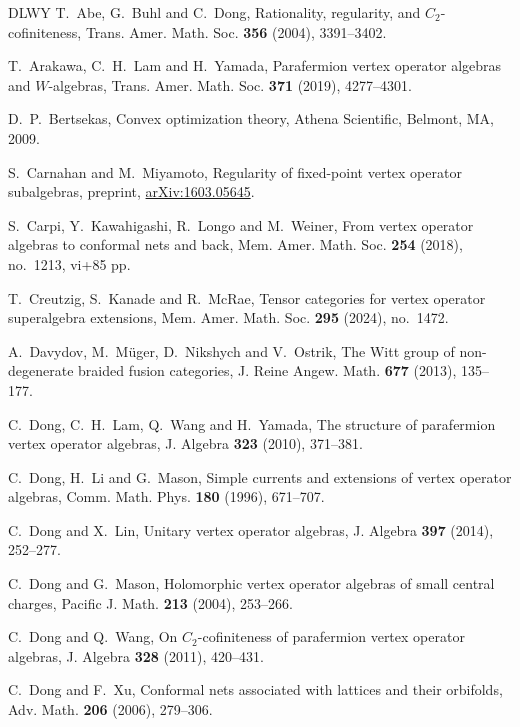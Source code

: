 \documentclass[11pt,reqno]{amsart}
\theoremstyle{definition}\newtheorem{definition}[theorem]{Definition}
\theoremstyle{remark}\newtheorem{remark}[theorem]{Remark}
\numberwithin{equation}{section}
\begin{document}
\begin{thebibliography}{DLWY}
\hypersetup{allcolors=black}
 T.~Abe, G.~Buhl and C.~Dong, Rationality, regularity, and $C_2$-cofiniteness, Trans. Amer. Math. Soc. \textbf{356} (2004), 3391--3402.

 T.~Arakawa, C.~H.~Lam and H.~Yamada, Parafermion vertex operator algebras and $W$-algebras, Trans. Amer. Math. Soc. \textbf{371} (2019), 4277--4301.

 D.~P.~Bertsekas, Convex optimization theory, Athena Scientific, Belmont, MA, 2009.

 S.~Carnahan and M.~Miyamoto, Regularity of fixed-point vertex operator subalgebras, preprint, \href{https://arxiv.org/abs/1603.05645}{arXiv:1603.05645}.

 S.~Carpi, Y.~Kawahigashi, R.~Longo and M.~Weiner, From vertex operator algebras to conformal nets and back, Mem. Amer. Math. Soc. \textbf{254} (2018), no.~1213, vi+85 pp.

 T.~Creutzig, S.~Kanade and R.~McRae, Tensor categories for vertex operator superalgebra extensions, Mem. Amer. Math. Soc. \textbf{295} (2024), no.~1472.

 A.~Davydov, M.~M\"uger, D.~Nikshych and V.~Ostrik, The Witt group of non-degenerate braided fusion categories, J. Reine Angew. Math. \textbf{677} (2013), 135--177.

 C.~Dong, C.~H.~Lam, Q.~Wang and H.~Yamada, The structure of parafermion vertex operator algebras, J. Algebra \textbf{323} (2010), 371--381.

 C.~Dong, H.~Li and G.~Mason, Simple currents and extensions of vertex operator algebras, Comm. Math. Phys. \textbf{180} (1996), 671--707.

 C.~Dong and X.~Lin, Unitary vertex operator algebras, J. Algebra \textbf{397} (2014), 252--277.

 C.~Dong and G.~Mason, Holomorphic vertex operator algebras of small central charges, Pacific J. Math. \textbf{213} (2004), 253--266.

 C.~Dong and Q.~Wang, On $C_2$-cofiniteness of parafermion vertex operator algebras, J. Algebra \textbf{328} (2011), 420--431.

 C.~Dong and F.~Xu, Conformal nets associated with lattices and their orbifolds, Adv. Math. \textbf{206} (2006), 279--306.


\end{thebibliography}
\end{document}
